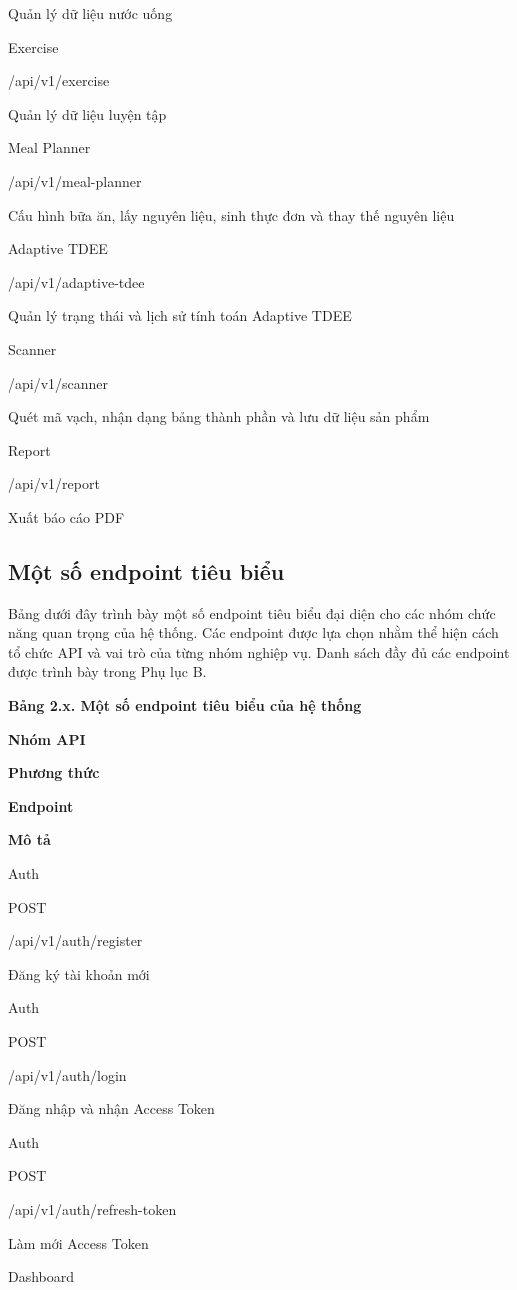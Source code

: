 \documentclass[12pt, a4paper]{report}
\begin{document}
Quản lý dữ liệu nước uống

Exercise

/api/v1/exercise

Quản lý dữ liệu luyện tập

Meal Planner

/api/v1/meal-planner

Cấu hình bữa ăn, lấy nguyên liệu, sinh thực đơn và thay thế nguyên liệu

Adaptive TDEE

/api/v1/adaptive-tdee

Quản lý trạng thái và lịch sử tính toán Adaptive TDEE

Scanner

/api/v1/scanner

Quét mã vạch, nhận dạng bảng thành phần và lưu dữ liệu sản phẩm

Report

/api/v1/report

Xuất báo cáo PDF

\subsection{Một số endpoint tiêu biểu}Bảng dưới đây trình bày một số endpoint tiêu biểu đại diện cho các nhóm chức năng quan trọng của hệ thống. Các endpoint được lựa chọn nhằm thể hiện cách tổ chức API và vai trò của từng nhóm nghiệp vụ. Danh sách đầy đủ các endpoint được trình bày trong Phụ lục B.

\textbf{Bảng 2.x. Một số endpoint tiêu biểu của hệ thống}

\textbf{Nhóm API}

\textbf{Phương thức}

\textbf{Endpoint}

\textbf{Mô tả}

Auth

POST

/api/v1/auth/register

Đăng ký tài khoản mới

Auth

POST

/api/v1/auth/login

Đăng nhập và nhận Access Token

Auth

POST

/api/v1/auth/refresh-token

Làm mới Access Token

Dashboard
\end{document}
